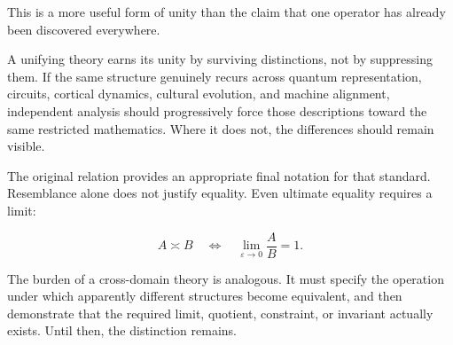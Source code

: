 \documentclass[11pt]{article}
\newcommand{\ulteq}{\mathrel{\text{≍}}}
\begin{document}
This is a more useful form of unity than the claim that one operator has already been discovered everywhere.

A unifying theory earns its unity by surviving distinctions, not by suppressing them. If the same structure genuinely recurs across quantum representation, circuits, cortical dynamics, cultural evolution, and machine alignment, independent analysis should progressively force those descriptions toward the same restricted mathematics. Where it does not, the differences should remain visible.

The original relation provides an appropriate final notation for that standard. Resemblance alone does not justify equality. Even ultimate equality requires a limit:

\begin{equation}
A\ulteq B
\quad\Longleftrightarrow\quad
\lim_{\varepsilon\to0}\frac{A}{B}=1.
\end{equation}

The burden of a cross-domain theory is analogous. It must specify the operation under which apparently different structures become equivalent, and then demonstrate that the required limit, quotient, constraint, or invariant actually exists. Until then, the distinction remains.
\end{document}
